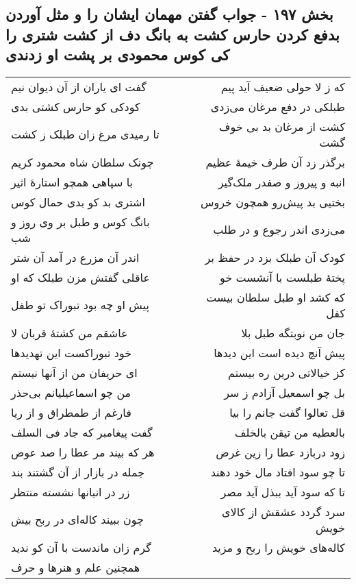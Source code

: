 \begin{center}
\section*{بخش ۱۹۷ - جواب گفتن مهمان ایشان را و مثل آوردن بدفع کردن حارس کشت به بانگ دف از کشت شتری را کی کوس محمودی بر پشت او زدندی}
\label{sec:sh197}
\begin{longtable}{l p{0.5cm} r}
گفت ای یاران از آن دیوان نیم
&&
که ز لا حولی ضعیف آید پیم
\\
کودکی کو حارس کشتی بدی
&&
طبلکی در دفع مرغان می‌زدی
\\
تا رمیدی مرغ زان طبلک ز کشت
&&
کشت از مرغان بد بی خوف گشت
\\
چونک سلطان شاه محمود کریم
&&
برگذر زد آن طرف خیمهٔ عظیم
\\
با سپاهی همچو استارهٔ اثیر
&&
انبه و پیروز و صفدر ملک‌گیر
\\
اشتری بد کو بدی حمال کوس
&&
بختیی بد پیش‌رو همچون خروس
\\
بانگ کوس و طبل بر وی روز و شب
&&
می‌زدی اندر رجوع و در طلب
\\
اندر آن مزرع در آمد آن شتر
&&
کودک آن طبلک بزد در حفظ بر
\\
عاقلی گفتش مزن طبلک که او
&&
پختهٔ طبلست با آنشست خو
\\
پیش او چه بود تبوراک تو طفل
&&
که کشد او طبل سلطان بیست کفل
\\
عاشقم من کشتهٔ قربان لا
&&
جان من نوبتگه طبل بلا
\\
خود تبوراکست این تهدیدها
&&
پیش آنچ دیده است این دیدها
\\
ای حریفان من از آنها نیستم
&&
کز خیالاتی درین ره بیستم
\\
من چو اسماعیلیانم بی‌حذر
&&
بل چو اسمعیل آزادم ز سر
\\
فارغم از طمطراق و از ریا
&&
قل تعالوا گفت جانم را بیا
\\
گفت پیغامبر که جاد فی السلف
&&
بالعطیه من تیقن بالخلف
\\
هر که بیند مر عطا را صد عوض
&&
زود دربازد عطا را زین غرض
\\
جمله در بازار از آن گشتند بند
&&
تا چو سود افتاد مال خود دهند
\\
زر در انبانها نشسته منتظر
&&
تا که سود آید ببذل آید مصر
\\
چون ببیند کاله‌ای در ربح بیش
&&
سرد گردد عشقش از کالای خویش
\\
گرم زان ماندست با آن کو ندید
&&
کاله‌های خویش را ربح و مزید
\\
همچنین علم و هنرها و حرف
&&

\end{longtable}
\end{center}
